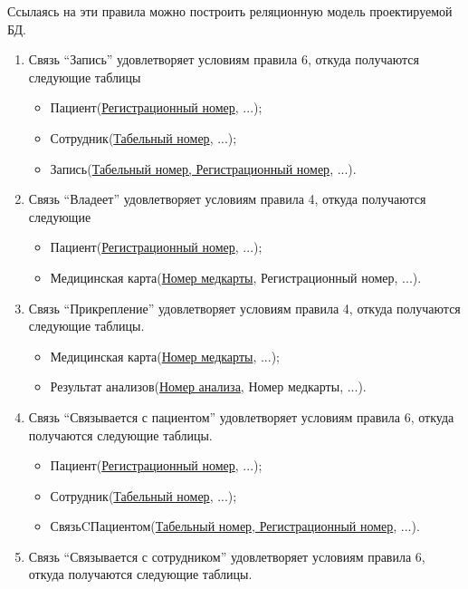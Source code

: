 \documentclass[14pt,a4paper,russian]{extreport}
\begin{document}
Ссылаясь на эти правила можно построить реляционную модель проектируемой БД.
\begin{enumerate}
    \item Связь ``Запись'' удовлетворяет условиям правила 6, откуда получаются следующие
        таблицы
        \begin{itemize}
            \item Пациент(\underline{Регистрационный номер}, ...);
            \item Сотрудник(\underline{Табельный номер}, ...);
            \item Запись(\underline{Табельный номер, Регистрационный номер}, ...).
        \end{itemize}
    \item Связь ``Владеет'' удовлетворяет условиям правила 4, откуда получаются следующие
        \begin{itemize}
            \item Пациент(\underline{Регистрационный номер}, ...);
            \item Медицинская карта(\underline{Номер медкарты}, Регистрационный номер, ...).
        \end{itemize}
    \item Связь ``Прикрепление'' удовлетворяет условиям правила 4, откуда получаются следующие
        таблицы.
        \begin{itemize}
            \item Медицинская карта(\underline{Номер медкарты}, ...);
            \item Результат анализов(\underline{Номер анализа}, Номер медкарты, ...).
        \end{itemize}
    \item Связь ``Связывается с пациентом'' удовлетворяет условиям правила 6, откуда получаются
        следующие таблицы.
        \begin{itemize}
            \item Пациент(\underline{Регистрационный номер}, ...);
            \item Сотрудник(\underline{Табельный номер}, ...);
            \item СвязьCПациентом(\underline{Табельный номер, Регистрационный номер}, ...).
        \end{itemize}
    \item Связь ``Связывается с сотрудником'' удовлетворяет условиям правила 6, откуда получаются
        следующие таблицы.
        \begin{itemize}

\end{itemize}
\end{enumerate}
\end{document}
